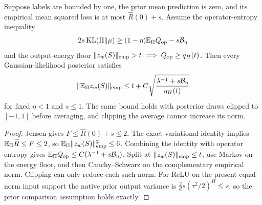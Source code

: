 \begin{lemma}
Suppose labels are bounded by one, the prior mean prediction is zero, and its empirical mean squared loss is at most $\widehat R(0)+s$. Assume the operator-entropy inequality
\[
 2s\operatorname{KL}(\Pi\|\mu)
 \ge(1-\eta)\mathbb E_\Pi Q_{\rm op}-s\mathcal B_\eta
\]
and the output-energy floor
$\|z_w(S)\|_{\rm emp}>t\implies Q_{\rm op}\ge q_H(t)$.
Then every Gaussian-likelihood posterior satisfies
\[
 \|\mathbb E_\Pi z_w(S)\|_{\rm emp}
 \le t+C\sqrt{\frac{\lambda^{-1}+s\mathcal B_\eta}{q_H(t)}}
\]
for fixed $\eta<1$ and $s\le1$. The same bound holds with posterior draws clipped to $[-1,1]$ before averaging, and clipping the average cannot increase its norm.
\end{lemma}
\begin{proof}
Jensen gives $F\le\widehat R(0)+s\le2$.
The exact variational identity implies $\mathbb E_\Pi\widehat R\le F\le2$, so
$\mathbb E_\Pi\|z_w(S)\|_{\rm emp}^2\le6$.
Combining the identity with operator entropy gives
$\mathbb E_\Pi Q_{\rm op}\le C(\lambda^{-1}+s\mathcal B_\eta)$.
Split at $\|z_w(S)\|_{\rm emp}\le t$, use Markov on the energy floor, and then Cauchy--Schwarz on the complementary empirical norm. Clipping can only reduce each such norm.
For ReLU on the present equal-norm input support the native prior output variance is
$\frac2d s(\tau^2/2)^H\le s$, so the prior comparison assumption holds exactly.
\end{proof}
